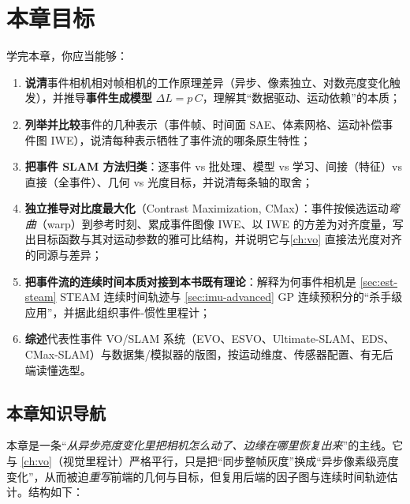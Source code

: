 \section*{本章目标}
学完本章，你应当能够：
\begin{enumerate}
  \item \textbf{说清}事件相机相对帧相机的工作原理差异（异步、像素独立、对数亮度变化触发），并推导\textbf{事件生成模型} $\Delta L=p\,C$，理解其“数据驱动、运动依赖”的本质；
  \item \textbf{列举并比较}事件的几种表示（事件帧、时间面 SAE、体素网格、运动补偿事件图 IWE），说清每种表示牺牲了事件流的哪条原生特性；
  \item \textbf{把事件 SLAM 方法归类}：逐事件 vs 批处理、模型 vs 学习、间接（特征）vs 直接（全事件）、几何 vs 光度目标，并说清每条轴的取舍；
  \item \textbf{独立推导对比度最大化}（Contrast Maximization, CMax）：事件按候选运动\emph{弯曲}（warp）到参考时刻、累成事件图像 IWE、以 IWE 的方差为对齐度量，写出目标函数与其对运动参数的雅可比结构，并说明它与\cref{ch:vo} 直接法光度对齐的同源与差异；
  \item \textbf{把事件流的连续时间本质对接到本书既有理论}：解释为何事件相机是 \cref{sec:est-steam} STEAM 连续时间轨迹与 \cref{sec:imu-advanced} GP 连续预积分的“杀手级应用”，并据此组织事件-惯性里程计；
  \item \textbf{综述}代表性事件 VO/SLAM 系统（EVO、ESVO、Ultimate-SLAM、EDS、CMax-SLAM）与数据集/模拟器的版图，按运动维度、传感器配置、有无后端读懂选型。
\end{enumerate}

\subsection*{本章知识导航}
本章是一条“\emph{从异步亮度变化里把相机怎么动了、边缘在哪里恢复出来}”的主线。它与 \cref{ch:vo}（视觉里程计）严格平行，只是把“同步整帧灰度”换成“异步像素级亮度变化”，从而被迫\emph{重写}前端的几何与目标，但复用后端的因子图与连续时间轨迹估计。结构如下：

